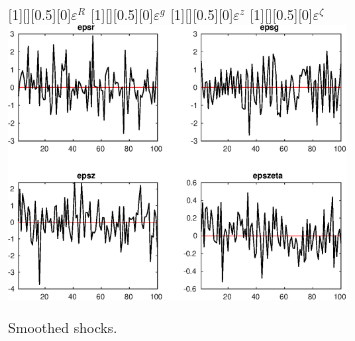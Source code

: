  
\begin{figure}[H]
[1][][0.5][0]{$ {\varepsilon^R} $}
[1][][0.5][0]{$ {\varepsilon^g} $}
[1][][0.5][0]{$ {\varepsilon^z} $}
[1][][0.5][0]{$ {\varepsilon^\zeta} $}
\centering 
\includegraphics[width=0.80\textwidth]{AnSchoModTheBuilder_SmoothedShocks1}
\caption{Smoothed shocks.}\label{Fig:SmoothedShocks:1}
\end{figure}


